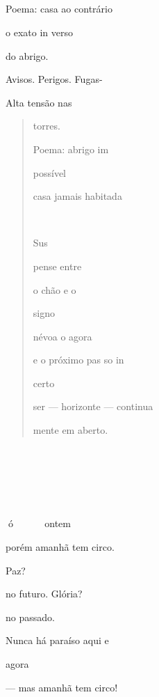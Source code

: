 







Poema: casa ao contrário

o exato in verso

do abrigo.

Avisos. Perigos. Fugas-

Alta tensão nas

\begin{quote}
torres.

Poema: abrigo im

possível

casa jamais habitada



Sus

pense entre

o chão e o

signo

névoa o agora

e o próximo pas so in

certo

ser --- horizonte --- continua

mente em aberto.
\end{quote}







ó   ontem

porém amanhã tem circo.

Paz?

no futuro. Glória?

no passado.

Nunca há paraíso aqui e

agora

--- mas amanhã tem circo!


